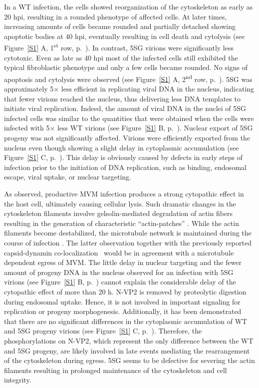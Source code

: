 In a WT infection, the cells showed reorganization of the cytoskeleton as early as 20 hpi, resulting in a rounded phenotype of affected cells. At later times, increasing amounts of cells became rounded and partially detached showing apoptotic bodies at 40 hpi, eventually resulting in cell death and cytolysis (see Figure~\ref{S1} A, 1\textsuperscript{st} row, p.~\pageref{S1}). In contrast, 5SG virions were significantly less cytotoxic. Even as late as 40 hpi most of the infected cells still exhibited the typical fibroblastic phenotype and only a few cells became rounded. No signs of apoptosis and cytolysis were observed (see Figure~\ref{S1} A, 2\textsuperscript{nd} row, p.~\pageref{S1}). 5SG was approximately 5$\times$ less efficient in replicating viral DNA in the nucleus, indicating that fewer virions reached the nucleus, thus delivering less DNA templates to initiate viral replication. Indeed, the amount of viral DNA in the nuclei of 5SG infected cells was similar to the quantities that were obtained when the cells were infected with 5$\times$ less WT virions (see Figure~\ref{S1} B, p.~\pageref{S1}). Nuclear export of 5SG progeny was not significantly affected. Virions were efficiently exported from the nucleus even though showing a slight delay in cytoplasmic accumulation (see Figure~\ref{S1} C, p.~\pageref{S1}). This delay is obviously caused by defects in early steps of infection prior to the initiation of DNA replication, such as binding, endosomal escape, viral uptake, or nuclear targeting.


As observed, productive MVM infection produces a strong cytopathic effect in the host cell, ultimately causing cellular lysis. Such dramatic changes in the cytoskeleton filaments involve gelsolin-mediated degradation of actin fibers resulting in the generation of characteristic ``actin-patches'' \cite{pmid18704167}. While the actin filaments become destabilized, the microtubule network is maintained during the course of infection \cite{pmid15582663}. The latter observation together with the previously reported capsid-dynamin co-localization~\cite{pmid18704167} would be in agreement with a microtubule dependent egress of MVM. The little delay in nuclear targeting and the fewer amount of progeny DNA in the nucleus observed for an infection with 5SG virions (see Figure~\ref{S1} B, p.~\pageref{S1}) cannot explain the considerable delay of the cytopathic effect of more than 20 h. N-VP2 is removed by proteolytic digestion during endosomal uptake. Hence, it is not involved in important signaling for replication or progeny morphogenesis. Additionally, it has been demonstrated that there are no significant differences in the cytoplasmic accumulation of WT and 5SG progeny virions (see Figure~\ref{S1} C, p.~\pageref{S1}). Therefore, the phosphorylations on N-VP2, which represent the only difference between the WT and 5SG progeny, are likely involved in late events mediating the rearrangement of the cytoskeleton during egress. 5SG seems to be defective for severing the actin filaments resulting in prolonged maintenance of the cytoskeleton and cell integrity. 


